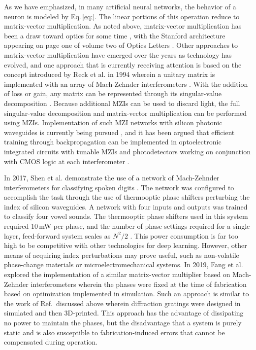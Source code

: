 As we have emphasized, in many artificial neural networks, the behavior of a neuron is modeled by Eq.\,\ref{eq:}. The linear portions of this operation reduce to matrix-vector multiplication. As noted above, matrix-vector multiplication has been a draw toward optics for some time \cite{godi1978,ve1984,maar1987}, with the Stanford architecture appearing on page one of volume two of Optics Letters \cite{godi1978}. Other approaches to matrix-vector multiplication have emerged over the years as technology has evolved, and one approach that is currently receiving attention is based on the concept introduced by Reck et al. in 1994 wherein a unitary matrix is implemented with an array of Mach-Zehnder interferometers \cite{reze1994}. With the addition of loss or gain, any matrix can be represented through its singular-value decomposition \cite{st2016}. Because additional MZIs can be used to discard light, the full singular-value decomposition and matrix-vector multiplication can be performed using MZIs. Implementation of such MZI networks with silicon photonic waveguides is currently being pursued \cite{mi2015,shha2017}, and it has been argued that efficient training through backpropagation can be implemented in optoelectronic integrated circuits with tunable MZIs and photodetectors working on conjunction with CMOS logic at each interferometer \cite{humi2018}.

In 2017, Shen et al. demonstrate the use of a network of Mach-Zehnder interferometers for classifying spoken digits \cite{shha2017}. The network was configured to accomplish the task through the use of thermooptic phase shifters perturbing the index of silicon waveguides. A network with four inputs and outputs was trained to classify four vowel sounds. The thermooptic phase shifters used in this system required 10\,mW per phase, and the number of phase settings required for a single-layer, feed-forward system scales as $N^2/2$ \cite{reze1994}. This power consumption is far too high to be competitive with other technologies for deep learning. However, other means of acquiring index perturbations may prove useful, such as non-volatile phase-change materials or microelectromechanical systems. In 2019, Fang et al. explored the implementation of a similar matrix-vector multiplier based on Mach-Zehnder interferometers wherein the phases were fixed at the time of fabrication based on optimization implemented in simulation. Such an approach is similar to the work of Ref.\,\cite{liri2018} discussed above wherein diffraction gratings were designed in simulated and then 3D-printed. This approach has the advantage of dissipating no power to maintain the phases, but the disadvantage that a system is purely static and is also susceptible to fabrication-induced errors that cannot be compensated during operation. 

